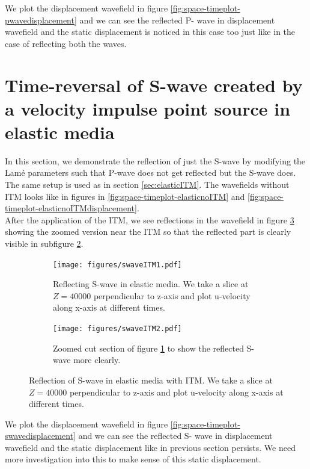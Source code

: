 We plot the displacement wavefield in figure \ref{fig:space-timeplot-pwavedisplacement} and we can see the reflected P- wave in displacement wavefield and the static
displacement is noticed in this case too just like in the case of reflecting both the waves. 

\section{Time-reversal of S-wave created by a velocity impulse point source in elastic media} \label{sec:elasticITMswave}
In this section, we demonstrate the reflection of just the S-wave by modifying the Lam\'{e} parameters such that P-wave does not
get reflected but the S-wave does. The same setup is used as in section \ref{sec:elasticITM}. The wavefields without \ac{ITM} looks like in figures in \ref{fig:space-timeplot-elasticnoITM}
and \ref{fig:space-timeplot-elasticnoITMdisplacement}. \\

After the application of the \ac{ITM}, we see reflections in the wavefield in figure \ref{fig:space-timeplot-swave} showing the zoomed version near the 
\ac{ITM} so that the reflected part is clearly visible in subfigure \ref{subfig:swavezoomed}.

\begin{figure}
    \begin{subfigure}[t]{0.49\textwidth}   
        \centering 
        \texttt{[image: figures/swaveITM1.pdf]}
        \caption{Reflecting S-wave in elastic media. We take a slice at $Z=40000$ perpendicular to z-axis
        and plot u-velocity along x-axis at different times.}
        \label{subfig:swave}
    \end{subfigure}
    \hfill
    \begin{subfigure}[t]{0.49\textwidth}   
        \centering 
        \texttt{[image: figures/swaveITM2.pdf]}
        \caption{Zoomed cut section of figure \ref{subfig:swave} to show the reflected S-wave more clearly.}
        \label{subfig:swavezoomed}
    \end{subfigure}
    \caption{Reflection of S-wave in elastic media with \ac{ITM}. We take a slice at $Z=40000$ perpendicular to z-axis and plot u-velocity along x-axis at different times.}
    \label{fig:space-timeplot-swave}
\end{figure}
    
We plot the displacement wavefield in figure \ref{fig:space-timeplot-swavedisplacement} and we can see the reflected S- wave in displacement 
wavefield and the static displacement like in previous section persists. We need more investigation into this to make sense of this static displacement.

